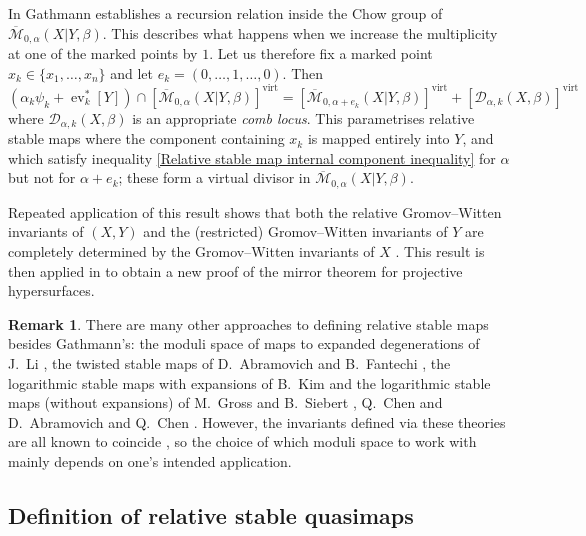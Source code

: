 \documentclass[11pt]{amsart}
\newcommand{\M}[4]{\overline{\mathcal{M}}_{#1,#2}(#3,#4)}
\newcommand{\virt}[1]{[#1]^{\operatorname{virt}}}
\newcommand{\ev}{\operatorname{ev}}
\theoremstyle{definition}
\theoremstyle{definition}
\newtheorem{remark}[thm]{Remark}
\newcommand{\ilemph}[1]{\emph{#1}}
\begin{document}
In \cite[\S\S 2-4]{Ga} Gathmann establishes a recursion relation inside the Chow group of $\M{0}{\alpha}{X|Y}{\beta}$. This describes what happens when we increase the multiplicity at one of the marked points by $1$. Let us therefore fix a marked point $x_k \in \{ x_1, \ldots, x_n \}$ and let $e_k = (0,\ldots,1,\ldots,0)$. Then
\begin{equation*} (\alpha_k \psi_k + \ev_k^* [Y]) \cap \virt{\M{0}{\alpha}{X|Y}{\beta}} = \virt{\M{0}{\alpha+e_k}{X|Y}{\beta}} + \virt{\mathcal{D}_{\alpha,k}(X,\beta)} \end{equation*}
where $\mathcal{D}_{\alpha,k}(X,\beta)$ is an appropriate \ilemph{comb locus}. This parametrises relative stable maps where the component containing $x_k$ is mapped entirely into $Y$, and which satisfy inequality \eqref{Relative stable map internal component inequality} for $\alpha$ but not for $\alpha+e_k$; these form a virtual divisor in $\M{0}{\alpha}{X|Y}{\beta}$.

Repeated application of this result shows that both the relative Gromov--Witten invariants of $(X,Y)$ and the (restricted) Gromov--Witten invariants of $Y$ are completely determined by the Gromov--Witten invariants of $X$ \cite[Corollary 5.7]{Ga}. This result is then applied in \cite{Ga-MF} to obtain a new proof of the mirror theorem for projective hypersurfaces.

\begin{remark} There are many other approaches to defining relative stable maps besides Gathmann's: the moduli space of maps to expanded degenerations of J.~Li \cite{Li1} \cite{Li2}, the twisted stable maps of D.~Abramovich and B.~Fantechi \cite{AbramovichFantechi}, the logarithmic stable maps with expansions of B.~Kim \cite{KimLog} and the logarithmic stable maps (without expansions) of M.~Gross and B.~Siebert \cite{GrossSiebertLog}, Q.~Chen \cite{ChenLog} and D.~Abramovich and Q.~Chen \cite{AbramovichChenLog}. However, the invariants defined via these theories are all known to coincide \cite{AbramovichMarcusWiseComparison} \cite{GathmannThesis}, so the choice of which moduli space to work with mainly depends on one's intended application. \end{remark}

\subsection{Definition of relative stable quasimaps} \label{Subsection relative stable quasimaps}
\end{document}
